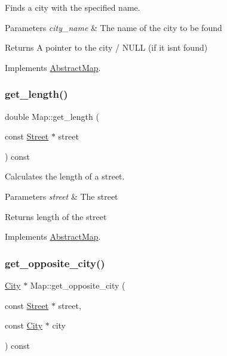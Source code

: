 Finds a city with the specified name. 


\begin{DoxyParams}{Parameters}
{\em city\+\_\+name} & The name of the city to be found \\
\hline
\end{DoxyParams}
\begin{DoxyReturn}{Returns}
A pointer to the city / N\+U\+LL (if it isn\textquotesingle{}t found) 
\end{DoxyReturn}


Implements \hyperlink{class_abstract_map_abda0a780cdd294491b1dff5c088b96a2}{Abstract\+Map}.

\mbox{\label{class_map_a041fd9e53a2e80a0fb3b1e11e3fdf1e9}} 
\subsubsection{\texorpdfstring{get\+\_\+length()}{get\_length()}}
{\footnotesize\ttfamily double Map\+::get\+\_\+length (\begin{DoxyParamCaption}\item[{const \hyperlink{class_street}{Street} $\ast$}]{street }\end{DoxyParamCaption}) const\hspace{0.3cm}{\ttfamily [virtual]}}



Calculates the length of a street. 


\begin{DoxyParams}{Parameters}
{\em street} & The street \\
\hline
\end{DoxyParams}
\begin{DoxyReturn}{Returns}
length of the street 
\end{DoxyReturn}


Implements \hyperlink{class_abstract_map_a19a4ead06c11b297f7ec9731574fa326}{Abstract\+Map}.

\mbox{\label{class_map_ac52744dc6f969ca6cdbca96f89d314ed}} 
\subsubsection{\texorpdfstring{get\+\_\+opposite\+\_\+city()}{get\_opposite\_city()}}
{\footnotesize\ttfamily \hyperlink{class_city}{City} $\ast$ Map\+::get\+\_\+opposite\+\_\+city (\begin{DoxyParamCaption}\item[{const \hyperlink{class_street}{Street} $\ast$}]{street,  }\item[{const \hyperlink{class_city}{City} $\ast$}]{city }\end{DoxyParamCaption}) const\hspace{0.3cm}{\ttfamily [virtual]}}



